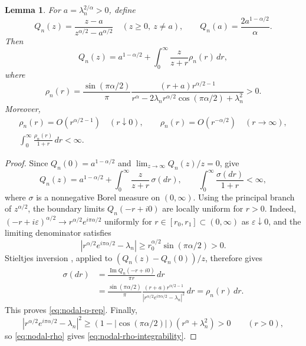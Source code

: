 \documentclass[11pt]{amsart}
\numberwithin{equation}{section}
\newtheorem{lemma}[lemma]{Lemma}
\theoremstyle{remark}
\begin{document}
\begin{lemma}\label{lem:nodal-multiplier}
For $a=\lambda_n^{2/\alpha}>0$, define
\begin{equation}\label{eq:nodal-q-def}
 Q_n(z)=\frac{z-a}{z^{\alpha/2}-a^{\alpha/2}}\quad(z\ge0,\ z\ne a),
 \qquad Q_n(a)=\frac{2a^{1-\alpha/2}}{\alpha}.
\end{equation}
Then
\begin{equation}\label{eq:nodal-q-rep}
 Q_n(z)=a^{1-\alpha/2}+\int_0^\infty\frac{z}{z+r}\rho_n(r)\,dr,
\end{equation}
where
\begin{equation}\label{eq:nodal-rho}
 \rho_n(r)=\frac{\sin(\pi\alpha/2)}\pi
 \frac{(r+a)r^{\alpha/2-1}}
      {r^{\alpha}-2\lambda_n r^{\alpha/2}\cos(\pi\alpha/2)+\lambda_n^2}>0.
\end{equation}
Moreover,
\begin{equation}\label{eq:nodal-rho-integrability}
 \begin{gathered}
 \rho_n(r)=O(r^{\alpha/2-1})\quad(r\downarrow0),\qquad
 \rho_n(r)=O(r^{-\alpha/2})\quad(r\to\infty),\\
 \int_0^\infty\frac{\rho_n(r)}{1+r}\,dr<\infty.
 \end{gathered}
\end{equation}
\end{lemma}
\begin{proof}
Since $Q_n(0)=a^{1-\alpha/2}$ and $\lim_{z\to\infty}Q_n(z)/z=0$,
\cite[Proposition~2.17(b) and Corollary~2.16(b)]{KwasnickiHalfLine} give
\[
 Q_n(z)=a^{1-\alpha/2}+\int_0^\infty\frac{z}{z+r}\,\sigma(dr),
 \qquad \int_0^\infty\frac{\sigma(dr)}{1+r}<\infty,
\]
where $\sigma$ is a nonnegative Borel measure on $(0,\infty)$.
Using the principal branch of $z^{\alpha/2}$, the boundary limits
$Q_n(-r+i0)$ are locally uniform for $r>0$.
Indeed, $(-r+i\varepsilon)^{\alpha/2}\to r^{\alpha/2}e^{i\pi\alpha/2}$
uniformly for $r\in[r_0,r_1]\subset(0,\infty)$ as $\varepsilon\downarrow0$,
and the limiting denominator satisfies
\[
 |r^{\alpha/2}e^{i\pi\alpha/2}-\lambda_n|
 \ge r_0^{\alpha/2}\sin(\pi\alpha/2)>0.
\]
Stieltjes inversion
\cite[Proposition~2.18]{KwasnickiHalfLine}, applied to
$(Q_n(z)-Q_n(0))/z$, therefore gives
\[
 \begin{aligned}
 \sigma(dr)&=\frac{\operatorname{Im}Q_n(-r+i0)}{\pi r}\,dr\\
 &=\frac{\sin(\pi\alpha/2)}\pi
   \frac{(r+a)r^{\alpha/2-1}}
        {|r^{\alpha/2}e^{i\pi\alpha/2}-\lambda_n|^2}\,dr
   =\rho_n(r)\,dr.
 \end{aligned}
\]
This proves \eqref{eq:nodal-q-rep}. Finally,
\begin{equation}\label{eq:nodal-denominator-bound}
 |r^{\alpha/2}e^{i\pi\alpha/2}-\lambda_n|^2
 \ge(1-|\cos(\pi\alpha/2)|)(r^\alpha+\lambda_n^2)>0
 \qquad(r>0),
\end{equation}
so \eqref{eq:nodal-rho} gives \eqref{eq:nodal-rho-integrability}.
\end{proof}
\end{document}
